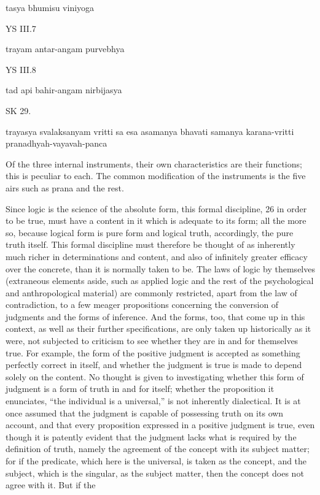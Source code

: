     tasya bhumisu viniyoga

YS III.7

    trayam antar-angam purvebhya

YS III.8

    tad api bahir-angam nirbijasya

SK 29.

trayasya svalaksanyam vritti sa esa asamanya bhavati
samanya karana-vritti pranadhyah-vayavah-panca

Of the three internal instruments, their own characteristics are their functions;
this is peculiar to each.
The common modification of the instruments is the five airs
such as prana and the rest.

Since logic is the science of the absolute form, this formal discipline, 26
in order to be true, must have a content in it which is adequate to its
form; all the more so, because logical form is pure form and logical truth,
accordingly, the pure truth itself. This formal discipline must therefore
be thought of as inherently much richer in determinations and content,
and also of infinitely greater efficacy over the concrete, than it is normally
taken to be. The laws of logic by themselves (extraneous elements aside,
such as applied logic and the rest of the psychological and anthropological
material) are commonly restricted, apart from the law of contradiction, to
a few meager propositions concerning the conversion of judgments and the
forms of inference. And the forms, too, that come up in this context, as well
as their further specifications, are only taken up historically as it were, not
subjected to criticism to see whether they are in and for themselves true.
For example, the form of the positive judgment is accepted as something
perfectly correct in itself, and whether the judgment is true is made to
depend solely on the content. No thought is given to investigating whether
this form of judgment is a form of truth in and for itself; whether the
proposition it enunciates, “the individual is a universal,” is not inherently
dialectical. It is at once assumed that the judgment is capable of possessing
truth on its own account, and that every proposition expressed in a positive
judgment is true, even though it is patently evident that the judgment lacks
what is required by the definition of truth, namely the agreement of the
concept with its subject matter; for if the predicate, which here is the
universal, is taken as the concept, and the subject, which is the singular,
as the subject matter, then the concept does not agree with it. But if the
